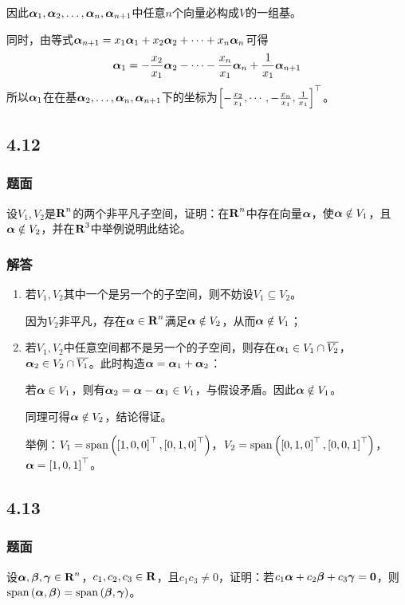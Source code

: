 \documentclass{beamer}
\begin{document}
\begin{frame}[allowframebreaks]
    因此\({\boldsymbol{\alpha}}_1,{\boldsymbol{\alpha}}_2,\dots,{\boldsymbol{\alpha}}_{n},\boldsymbol{\alpha}_{n+1}\)中任意\(n\)个向量必构成\(V\)的一组基。

    同时，由等式\(\boldsymbol{\alpha}_{n+1}=x_1\boldsymbol{\alpha}_1+x_2\boldsymbol{\alpha}_2+\cdots+x_n\boldsymbol{\alpha}_n\)可得
    \begin{equation*}
        \boldsymbol{\alpha}_1=-\frac{x_2}{x_1}\boldsymbol{\alpha}_2-\cdots-\frac{x_n}{x_1}\boldsymbol{\alpha}_n+\frac{1}{x_1}\boldsymbol{\alpha}_{n+1}
    \end{equation*}
    所以\(\boldsymbol{\alpha}_1\)在在基\(\boldsymbol{\alpha}_2,\dots,\boldsymbol{\alpha}_n,\boldsymbol{\alpha}_{n+1}\)下的坐标为\(\left[ -\frac{x_2}{x_1},\cdots,-\frac{x_n}{x_1},\frac{1}{x_1} \right]^\top\)。
\end{frame}

\subsection*{4.12}
\begin{frame}
    \frametitle{题面}
    设\(V_1,V_2\)是\(\boldsymbol{\mathrm{R}}^n\)的两个非平凡子空间，证明：在\(\boldsymbol{\mathrm{R}}^n\)中存在向量\(\boldsymbol{\alpha}\)，使\(\boldsymbol{\alpha}\notin V_1\)，且\(\boldsymbol{\alpha}\notin V_2\)，并在\(\boldsymbol{\mathrm{R}}^3\)中举例说明此结论。
\end{frame}

\begin{frame}
    \frametitle{解答}
    \begin{enumerate}
        \item {
              若\(V_1,V_2\)其中一个是另一个的子空间，则不妨设\(V_1\subseteq V_2\)。

              因为\(V_2\)非平凡，存在\(\boldsymbol{\alpha}\in\boldsymbol{\mathrm{R}}^n\)满足\(\boldsymbol{\alpha}\notin V_2\)，从而\(\boldsymbol{\alpha}\notin V_1\)；
              }\pause
        \item {
              若\(V_1,V_2\)中任意空间都不是另一个的子空间，则存在\(\boldsymbol{\alpha}_1\in V_1\cap\overline{V_2}\)，\(\boldsymbol{\alpha}_2\in V_2\cap\overline{V_1}\)。此时构造\(\boldsymbol{\alpha}=\boldsymbol{\alpha}_1+\boldsymbol{\alpha}_2\)：

              若\(\boldsymbol{\alpha}\in V_1\)，则有\(\boldsymbol{\alpha}_2=\boldsymbol{\alpha}-\boldsymbol{\alpha}_1\in V_1\)，与假设矛盾。因此\(\boldsymbol{\alpha}\notin V_1\)。

              同理可得\(\boldsymbol{\alpha}\notin V_2\)，结论得证。

              举例：\(V_1=\mathrm{span}\left( \left[ 1,0,0 \right]^\top,\left[ 0,1,0 \right]^\top \right)\)，\(V_2=\mathrm{span}\left( \left[ 0,1,0 \right]^\top,\left[ 0,0,1 \right]^\top \right)\)，\(\boldsymbol{\alpha}=\left[ 1,0,1 \right]^\top\)。
              }
    \end{enumerate}
\end{frame}

\subsection*{4.13}
\begin{frame}
    \frametitle{题面}
    设\(\boldsymbol{\alpha},\boldsymbol{\beta},\boldsymbol{\gamma}\in\boldsymbol{\mathrm{R}}^n\)，\(c_1,c_2,c_3\in\boldsymbol{\mathrm{R}}\)，且\(c_1c_3\neq0\)，证明：若\(c_1\boldsymbol{\alpha}+c_2\boldsymbol{\beta}+c_3\boldsymbol{\gamma}=\boldsymbol{0}\)，则\(\mathrm{span}\left( \boldsymbol{\alpha},\boldsymbol{\beta} \right)=\mathrm{span}\left( \boldsymbol{\beta},\boldsymbol{\gamma} \right)\)。
\end{frame}
\end{document}
